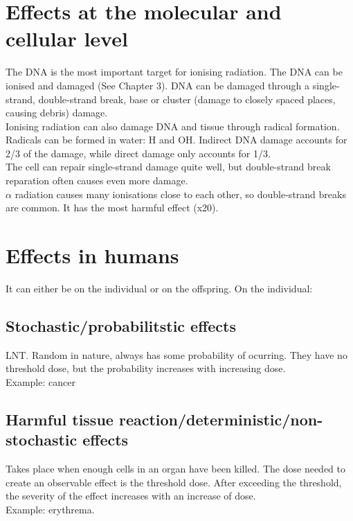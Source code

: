 \section{Effects at the molecular and cellular level}
The DNA is the most important target for ionising radiation. The DNA can be ionised and damaged (See Chapter 3). DNA can be damaged through a single-strand, double-strand break, base or cluster (damage to closely spaced places, causing debris) damage.\\
Ionising radiation can also damage DNA and tissue through radical formation. Radicals can be formed in water: H and OH. Indirect DNA damage accounts for 2/3 of the damage, while direct damage only accounts for 1/3.\\ 
The cell can repair single-strand damage quite well, but double-strand break reparation often causes even more damage. \\
$\alpha$ radiation causes many ionisations close to each other, so double-strand breaks are common. It has the most harmful effect (x20).
\section{Effects in humans}
It can either be on the individual or on the offspring. On the individual:
\subsection{Stochastic/probabilitstic effects}
LNT. Random in nature, always has some probability of ocurring. They have no threshold dose, but the probability increases with increasing dose.\\
Example: cancer

\subsection{Harmful tissue reaction/deterministic/non-stochastic effects}
Takes place when enough cells in an organ have been killed. The dose needed to create an observable effect is the threshold dose. After exceeding the threshold, the severity of the effect increases with an increase of dose.\\ Example: erythrema.
